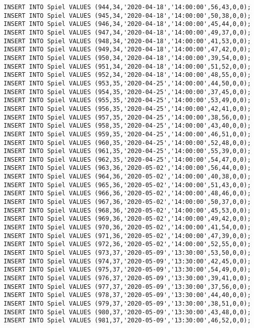 \documentclass{lehramt-informatik-aufgabe}
\begin{document}
\begin{verbatim}
INSERT INTO Spiel VALUES (944,34,'2020-04-18','14:00:00',56,43,0,0);
INSERT INTO Spiel VALUES (945,34,'2020-04-18','14:00:00',50,38,0,0);
INSERT INTO Spiel VALUES (946,34,'2020-04-18','14:00:00',45,44,0,0);
INSERT INTO Spiel VALUES (947,34,'2020-04-18','14:00:00',49,37,0,0);
INSERT INTO Spiel VALUES (948,34,'2020-04-18','14:00:00',41,53,0,0);
INSERT INTO Spiel VALUES (949,34,'2020-04-18','14:00:00',47,42,0,0);
INSERT INTO Spiel VALUES (950,34,'2020-04-18','14:00:00',39,54,0,0);
INSERT INTO Spiel VALUES (951,34,'2020-04-18','14:00:00',51,52,0,0);
INSERT INTO Spiel VALUES (952,34,'2020-04-18','14:00:00',48,55,0,0);
INSERT INTO Spiel VALUES (953,35,'2020-04-25','14:00:00',44,50,0,0);
INSERT INTO Spiel VALUES (954,35,'2020-04-25','14:00:00',37,45,0,0);
INSERT INTO Spiel VALUES (955,35,'2020-04-25','14:00:00',53,49,0,0);
INSERT INTO Spiel VALUES (956,35,'2020-04-25','14:00:00',42,41,0,0);
INSERT INTO Spiel VALUES (957,35,'2020-04-25','14:00:00',38,56,0,0);
INSERT INTO Spiel VALUES (958,35,'2020-04-25','14:00:00',43,40,0,0);
INSERT INTO Spiel VALUES (959,35,'2020-04-25','14:00:00',46,51,0,0);
INSERT INTO Spiel VALUES (960,35,'2020-04-25','14:00:00',52,48,0,0);
INSERT INTO Spiel VALUES (961,35,'2020-04-25','14:00:00',55,39,0,0);
INSERT INTO Spiel VALUES (962,35,'2020-04-25','14:00:00',54,47,0,0);
INSERT INTO Spiel VALUES (963,36,'2020-05-02','14:00:00',56,44,0,0);
INSERT INTO Spiel VALUES (964,36,'2020-05-02','14:00:00',40,38,0,0);
INSERT INTO Spiel VALUES (965,36,'2020-05-02','14:00:00',51,43,0,0);
INSERT INTO Spiel VALUES (966,36,'2020-05-02','14:00:00',48,46,0,0);
INSERT INTO Spiel VALUES (967,36,'2020-05-02','14:00:00',50,37,0,0);
INSERT INTO Spiel VALUES (968,36,'2020-05-02','14:00:00',45,53,0,0);
INSERT INTO Spiel VALUES (969,36,'2020-05-02','14:00:00',49,42,0,0);
INSERT INTO Spiel VALUES (970,36,'2020-05-02','14:00:00',41,54,0,0);
INSERT INTO Spiel VALUES (971,36,'2020-05-02','14:00:00',47,39,0,0);
INSERT INTO Spiel VALUES (972,36,'2020-05-02','14:00:00',52,55,0,0);
INSERT INTO Spiel VALUES (973,37,'2020-05-09','13:30:00',53,50,0,0);
INSERT INTO Spiel VALUES (974,37,'2020-05-09','13:30:00',42,45,0,0);
INSERT INTO Spiel VALUES (975,37,'2020-05-09','13:30:00',54,49,0,0);
INSERT INTO Spiel VALUES (976,37,'2020-05-09','13:30:00',39,41,0,0);
INSERT INTO Spiel VALUES (977,37,'2020-05-09','13:30:00',37,56,0,0);
INSERT INTO Spiel VALUES (978,37,'2020-05-09','13:30:00',44,40,0,0);
INSERT INTO Spiel VALUES (979,37,'2020-05-09','13:30:00',38,51,0,0);
INSERT INTO Spiel VALUES (980,37,'2020-05-09','13:30:00',43,48,0,0);
INSERT INTO Spiel VALUES (981,37,'2020-05-09','13:30:00',46,52,0,0);

\end{verbatim}
\end{document}
